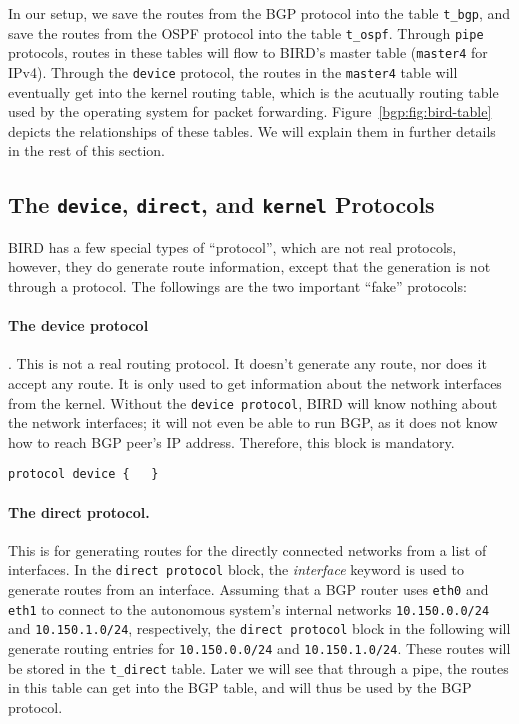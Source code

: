 In our setup, we save the routes from the BGP protocol 
into the table \texttt{t\_bgp}, and save
the routes from the OSPF protocol into the table \texttt{t\_ospf}. 
Through \texttt{pipe} protocols, routes in these tables
will flow to BIRD's master table (\texttt{master4} for IPv4).
Through the \texttt{device} protocol, the routes
in the \texttt{master4} table will eventually get 
into the kernel routing table, which is the acutually
routing table used by the operating system for packet forwarding.
Figure~\ref{bgp:fig:bird-table} depicts 
the relationships of these tables. We will explain 
them in further details in the rest of this section. 


\subsection{The \texttt{device}, \texttt{direct}, and \texttt{kernel} Protocols} 

BIRD has a few special types of ``protocol'', which are not
real protocols, however, they do generate route information,
except that the generation is not through a protocol. 
The followings
are the two important ``fake'' protocols:

\paragraph{The device protocol}. This is not a real routing protocol. It doesn't
generate any route, nor does it accept any route. It is only used to get
information about the network interfaces from the kernel. Without the
\texttt{device protocol}, BIRD will know nothing about the network
interfaces; it will not even be able to run BGP, as it does not know how
to reach BGP peer's IP address. Therefore, this block is mandatory.

\begin{lstlisting}
protocol device {   }
\end{lstlisting}


\paragraph{The direct protocol.} 
This is for generating routes for the directly
connected networks from a list of interfaces. In the \texttt{direct protocol}
block, the \textit{interface} keyword is used to generate routes from an
interface. Assuming that a BGP router uses \texttt{eth0} and \texttt{eth1}
to connect to the autonomous system's internal networks 
\texttt{10.150.0.0/24} and \texttt{10.150.1.0/24}, respectively, 
the \texttt{direct protocol} block in the following 
will generate routing entries for 
\texttt{10.150.0.0/24} and \texttt{10.150.1.0/24}. These routes 
will be stored in the \texttt{t\_direct} table. Later we will 
see that through a pipe, the routes in this table can get 
into the BGP table, and will thus be used by the BGP protocol. 

